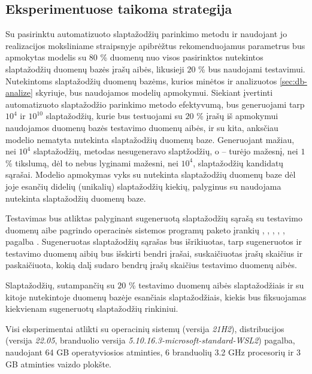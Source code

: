 \documentclass{VUMIFInfBakalaurinis}
\begin{document}
\subsection{Eksperimentuose taikoma strategija} \label{sec:strategy}
Su pasirinktu automatizuoto slaptažodžių parinkimo metodu ir naudojant jo 
realizacijos moksliniame straipsnyje apibrėžtus rekomenduojamus parametrus bus 
apmokytas modelis su $80$ \% duomenų nuo visos pasirinktos nutekintos 
slaptažodžių duomenų bazės įrašų aibės, likusieji $20$ \% bus naudojami 
testavimui. Nutekintoms slaptažodžių duomenų bazėms, kurios minėtos ir 
analizuotos \ref{sec:db-analize} skyriuje, bus naudojamos modelių apmokymui. 
Siekiant įvertinti automatizuoto slaptažodžio parinkimo metodo efektyvumą, bus 
generuojami tarp $10^{4}$ ir $10^{10}$ slaptažodžių, kurie bus testuojami su 
$20$ \% įrašų iš apmokymui naudojamos duomenų bazės testavimo duomenų aibės, ir 
su kita, anksčiau modelio nematyta nutekinta slaptažodžių duomenų baze. 
Generuojant mažiau, nei $10^{4}$ slaptažodžių,  metodas 
nesugeneravo slaptžodžių, o  -- turėjo mažesnį, nei $1$ \% 
tikslumą, dėl to nebus lyginami mažesni, nei $10^{4}$, slaptažodžių kandidatų 
sąrašai. Modelio apmokymas vyks su  nutekinta slaptažodžių 
duomenų baze dėl joje esančių didelių (unikalių) slaptažodžių kiekių, palyginus 
su naudojama  nutekinta slaptažodžių duomenų baze.

Testavimas bus atliktas palyginant sugeneruotą slaptažodžių sąrašą su testavimo 
duomenų aibe  pagrindo operacinės sistemos programų paketo 
 įrankių , 
, , , , 
 pagalba \cite{Coreutils}. Sugeneruotas slaptažodžių sąrašas bus 
išrikiuotas, tarp sugeneruotos ir testavimo duomenų aibių bus išskirti bendri 
įrašai, suskaičiuotas įrašų skaičius ir paskaičiuota, kokią dalį sudaro bendrų 
įrašų skaičius testavimo duomenų aibės.

Slaptažodžių, sutampančių su $20$ \% testavimo duomenų aibės slaptažodžiais ir 
su kitoje nutekintoje duomenų bazėje esančiais slaptažodžiais, kiekis bus 
fiksuojamas kiekvienam sugeneruotų slaptažodžių rinkiniui.

Visi eksperimentai atlikti su operacinių sistemų  (versija \textit{21H2}),  distribucijos  
(versija \textit{22.05},  branduolio versija 
\textit{5.10.16.3-microsoft-standard-WSL2}) pagalba, naudojant 64 GB 
operatyviosios atminties, 6 branduolių 3.2 GHz  
procesorių ir 3 GB atminties  vaizdo plokšte.
\end{document}

